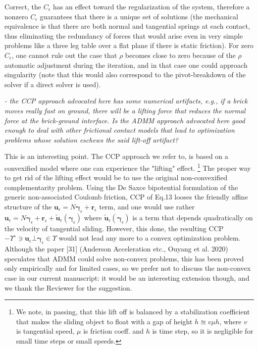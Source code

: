 \documentclass[final,12pt]{article}
\def\vect#1{{\boldsymbol{#1}}}
\def\reviewercomment#1{{\vskip4mm \color{mycommentcolor} \textit{#1} \vskip2mm}}
\begin{document}
Correct, the $C_\epsilon$ has an effect toward the regularization of the system, therefore a nonzero $C_\epsilon$ guarantees that there is a unique set of solutions (the mechanical equivalence is that there are both normal and tangential springs at each contact, thus eliminating the redundancy of forces that would arise even in very simple problems like a three leg table over a flat plane if there is static friction). For zero $C_\epsilon$, one cannot rule out the case that $\rho$ becomes close to zero because of the $\rho$ automatic adjustment during the iteration, and in that case one could approach singularity (note that this would also correspond to the pivot-breakdown of the solver if a direct solver is used).

\reviewercomment{
- the CCP approach advocated here has some numerical artifacts, e.g., if a brick moves really fast on ground, there will be a lifting force that reduces the normal force at the brick-ground interface. Is the ADMM approach advocated here good enough to deal with other frictional contact models that lead to optimization problems whose solution eschews the said lift-off artifact?
}

This is an interesting point. The CCP approach we refer to, is based on a convexified model where one can experience the "lifting" effect. \footnote{We note, in passing, that this lift off is balanced by a stabilization coefficient that makes the sliding object to float with a gap of height $h\approxeq v \mu h$, where $v$ is tangential speed, $\mu$ is friction coeff. and $h$ is time step, so it is negligible for small time steps or small speeds.} The proper way to get rid of the lifting effect would be to use the original non-convexified complementarity problem. Using the De Saxce bipotential formulation of the generic non-associated Coulomb friction, CCP of Eq.13 looses the friendly affine structure of the 
$\vect{u}_\epsilon =  N \vect{\gamma}_\epsilon + \vect{r}_\epsilon$ 
term, and one would use rather 
$\vect{u}_\epsilon =   N \vect{\gamma}_\epsilon + \vect{r}_\epsilon + \tilde{\vect{u}}_\epsilon(\vect{\gamma}_\epsilon)$ where $\tilde{\vect{u}}_\epsilon(\vect{\gamma}_\epsilon)$ is a term that depends quadratically on the velocity of tangential sliding. However, this done, the resulting CCP 
$-\Upsilon^{\circ} \ni \vect{u}_\epsilon \bot \vect{\gamma}_\epsilon \in \Upsilon$ would not lead any more to a convex optimization problem. Although the paper [31] (Anderson Acceleration etc., Ouyang et al. 2020) speculates that ADMM could solve non-convex problems, this has been proved only empirically and for limited cases, so we prefer not to discuss the non-convex case in our current manuscript: it would be an interesting extension though, and we thank the Reviewer for the suggestion. 
\end{document}

